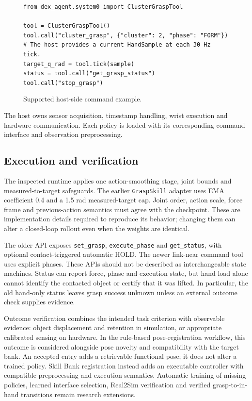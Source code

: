 \documentclass[10pt,twocolumn]{article}
\begin{document}
\begin{figure}[t]
\small\begin{verbatim}
from dex_agent.system0 import ClusterGraspTool

tool = ClusterGraspTool()
tool.call("cluster_grasp", {"cluster": 2, "phase": "FORM"})
# The host provides a current HandSample at each 30 Hz tick.
target_q_rad = tool.tick(sample)
status = tool.call("get_grasp_status")
tool.call("stop_grasp")
\end{verbatim}
\caption*{Supported host-side command example.}
\end{figure}

The host owns sensor acquisition, timestamp handling, wrist execution and hardware communication. Each policy is loaded with its corresponding command interface and observation preprocessing.

\subsection{Execution and verification}

The inspected runtime applies one action-smoothing stage, joint bounds and measured-to-target safeguards. The earlier \texttt{GraspSkill} adapter uses EMA coefficient 0.4 and a 1.5 rad measured-target cap. Joint order, action scale, force frame and previous-action semantics must agree with the checkpoint. These are implementation details required to reproduce its behavior; changing them can alter a closed-loop rollout even when the weights are identical.

The older API exposes \texttt{set\_grasp}, \texttt{execute\_phase} and \texttt{get\_status}, with optional contact-triggered automatic HOLD. The newer link-near command tool uses explicit phases. These APIs should not be described as interchangeable state machines. Status can report force, phase and execution state, but hand load alone cannot identify the contacted object or certify that it was lifted. In particular, the old hand-only status leaves grasp success unknown unless an external outcome check supplies evidence.

Outcome verification combines the intended task criterion with observable evidence: object displacement and retention in simulation, or appropriate calibrated sensing on hardware. In the rule-based pose-registration workflow, this outcome is considered alongside pose novelty and compatibility with the target bank. An accepted entry adds a retrievable functional pose; it does not alter a trained policy. Skill Bank registration instead adds an executable controller with compatible preprocessing and execution semantics. Automatic training of missing policies, learned interface selection, Real2Sim verification and verified grasp-to-in-hand transitions remain research extensions.
\end{document}
